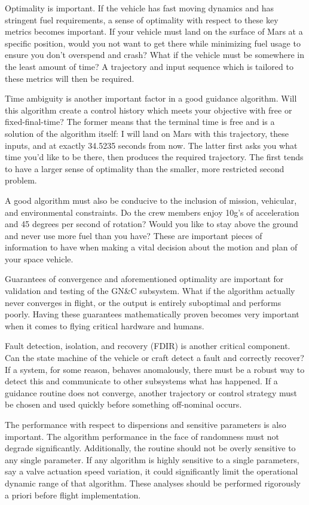Optimality is important. If the vehicle has fast moving dynamics and has stringent fuel requirements, a sense of optimality with respect to these key metrics becomes important. If your vehicle must land on the surface of Mars at a specific position, would you not want to get there while minimizing fuel usage to ensure you don't overspend and crash? What if the vehicle must be somewhere in the least amount of time? A trajectory and input sequence which is tailored to these metrics will then be required.

Time ambiguity is another important factor in a good guidance algorithm. Will this algorithm create a control history which meets your objective with free or fixed-final-time? The former means that the terminal time is free and is a solution of the algorithm itself: I will land on Mars with this trajectory, these inputs, and at exactly 34.5235 seconds from now. The latter first asks you what time you'd like to be there, then produces the required trajectory. The first tends to have a larger sense of optimality than the smaller, more restricted second problem.

A good algorithm must also be conducive to the inclusion of mission, vehicular, and environmental constraints. Do the crew members enjoy 10g's of acceleration and 45 degrees per second of rotation? Would you like to stay above the ground and never use more fuel than you have? These are important pieces of information to have when making a vital decision about the motion and plan of your space vehicle.

Guarantees of convergence and aforementioned optimality are important for validation and testing of the GN\&C subsystem. What if the algorithm actually never converges in flight, or the output is entirely suboptimal and performs poorly. Having these guarantees mathematically proven becomes very important when it comes to flying critical hardware and humans.

Fault detection, isolation, and recovery (FDIR) is another critical component. Can the state machine of the vehicle or craft detect a fault and correctly recover? If a system, for some reason, behaves anomalously, there must be a robust way to detect this and communicate to other subsystems what has happened. If a guidance routine does not converge, another trajectory or control strategy must be chosen and used quickly before something off-nominal occurs.

The performance with respect to dispersions and sensitive parameters is also important. The algorithm performance in the face of randomness must not degrade significantly. Additionally, the routine should not be overly sensitive to any single parameter. If any algorithm is highly sensitive to a single parameters, say a valve actuation speed variation, it could significantly limit the operational dynamic range of that algorithm. These analyses should be performed rigorously a priori before flight implementation.



